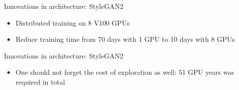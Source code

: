 \begin{frame}{Innovations in architecture: StyleGAN2}
\protect\hypertarget{innovations-in-architecture-stylegan2-5}{}

\begin{itemize}
\tightlist
\item
  Distributed training on 8 V100 GPUs
\item
  Reduce training time from 70 days with 1 GPU to 10 days with 8 GPUs
\end{itemize}


\end{frame}

\begin{frame}{Innovations in architecture: StyleGAN2}
\protect\hypertarget{innovations-in-architecture-stylegan2-6}{}

\begin{itemize}
\tightlist
\item
  One should not forget the cost of exploration as well: 51 GPU years
  was required in total
\end{itemize}


\end{frame}

